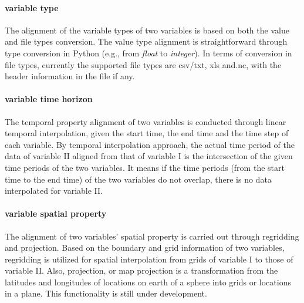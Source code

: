 \documentclass[review]{elsarticle}
\begin{document}
\paragraph{variable type} The alignment of the variable types of two variables is based on both the value and file types conversion. The value type alignment is straightforward through type conversion in Python (e.g., from \textit{float} to \textit{integer}). In terms of conversion in file types, currently the supported file types are csv/txt, xls and.nc, with the header information in the file if any. 

\paragraph{variable time horizon} The temporal property alignment of two variables is conducted through linear temporal interpolation, given the start time, the end time and the time step of each variable. By temporal interpolation approach, the actual time period of the data of variable II aligned from that of variable I is the intersection of the given time periods of the two variables. It means if the time periods (from the start time to the end time) of the two variables do not overlap, there is no data interpolated for variable II. 

\paragraph{variable spatial property} The alignment of two variables’ spatial property is carried out through regridding and projection. Based on the boundary and grid information of two variables, regridding is utilized for spatial interpolation from grids of variable I to those of variable II. Also, projection, or map projection is a transformation from the latitudes and longitudes of locations on earth of a sphere into grids or locations in a plane. This functionality is still under development.
\end{document}
